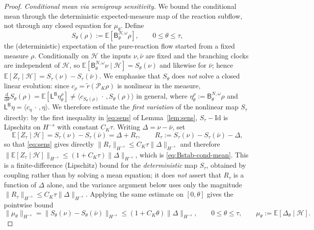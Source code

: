 \documentclass[a4paper,fleqn]{cas-sc}
\theoremstyle{definition}
\theoremstyle{remark}
\begin{document}
\begin{proof}
\emph{Conditional mean via semigroup sensitivity.} We bound the conditional mean
through the deterministic expected-measure map of the reaction subflow, not through
any closed equation for $\mu_\theta$. Define
\[
S_\theta(\rho):=\mathbb E[\mathsf B^{N,\omega}_\theta\rho],\qquad 0\le\theta\le\tau,
\]
the (deterministic) expectation of the pure-reaction flow started from a fixed
measure $\rho$. Conditionally on $\mathcal H$ the inputs $\nu,\bar\nu$ are fixed and
the branching clocks are independent of $\mathcal H$, so
$\mathbb E[\mathsf B^{N,\omega}_\theta\nu\mid\mathcal H]=S_\theta(\nu)$ and likewise
for $\bar\nu$; hence $\mathbb E[Z_\tau\mid\mathcal H]=S_\tau(\nu)-S_\tau(\bar\nu)$. We
emphasise that $S_\theta$ does \emph{not} solve a closed linear evolution: since
$c_\rho=\tilde r(\mathcal P_K\rho)$ is nonlinear in the measure,
$\frac{\mathrm d}{\mathrm d\theta}S_\theta(\rho)
=\mathbb E[\mathsf L^{\mathsf B}\eta^\rho_\theta]
\neq\langle c_{S_\theta(\rho)}\,\cdot\,,S_\theta(\rho)\rangle$ in general, where
$\eta^\rho_\theta:=\mathsf B^{N,\omega}_\theta\rho$ and
$\mathsf L^{\mathsf B}\eta=\langle c_\eta\,\cdot\,,\eta\rangle$. We therefore estimate
the \emph{first variation} of the nonlinear map $S_\tau$ directly: by the first
inequality in \eqref{eq:sens} of Lemma~\ref{lem:sens}, $S_\tau-\mathrm{Id}$ is
Lipschitz on $H^{-s}$ with constant $C_K\tau$. Writing $\Delta=\nu-\bar\nu$, set
\begin{equation}\label{eq:cond-drift}
\mathbb E[Z_\tau\mid\mathcal H]=S_\tau(\nu)-S_\tau(\bar\nu)=\Delta+R_\tau,
\qquad
R_\tau:=S_\tau(\nu)-S_\tau(\bar\nu)-\Delta,
\end{equation}
so that \eqref{eq:sens} gives directly $\|R_\tau\|_{H^{-s}}\le C_K\tau\|\Delta\|_{H^{-s}}$
and therefore
$\|\mathbb E[Z_\tau\mid\mathcal H]\|_{H^{-s}}\le(1+C_K\tau)\|\Delta\|_{H^{-s}}$, which is
\eqref{eq:Bstab-cond-mean}. This is a finite-difference (Lipschitz) bound for the
\emph{deterministic} map $S_\tau$, obtained by coupling rather than by solving a mean
equation; it does \emph{not} assert that $R_\tau$ is a function of $\Delta$ alone, and
the variance argument below uses only the magnitude
$\|R_\tau\|_{H^{-s}}\le C_K\tau\|\Delta\|_{H^{-s}}$. Applying the same estimate on
$[0,\theta]$ gives the pointwise bound
\begin{equation}\label{eq:mu-theta}
\|\mu_\theta\|_{H^{-s}}=\|S_\theta(\nu)-S_\theta(\bar\nu)\|_{H^{-s}}\le(1+C_K\theta)\|\Delta\|_{H^{-s}},
\qquad 0\le\theta\le\tau,
\qquad \mu_\theta:=\mathbb E[\Delta_\theta\mid\mathcal H].
\end{equation}


\end{proof}
\end{document}

